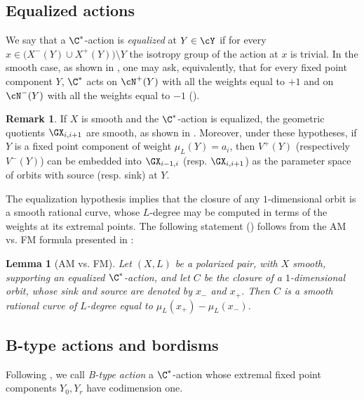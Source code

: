 \documentclass[reqno]{amsproc}
\newtheorem{lemma}[theorem]{Lemma}
\theoremstyle{definition}
\newtheorem{remark}[theorem]{Remark}
\begin{document}

\subsection{Equalized actions}\label{sssec:equal}

We say that a $\C^*$-action  is {\em  equalized} at $Y\in\cY$ if for every $x\in \big(X^{-}(Y)\cup X^{+}(Y)\big)\setminus Y$ the isotropy group of the action at $x$ is trivial. In the smooth case,  as shown in \cite[Lemma 2.1]{WORS3}, one may ask, equivalently, that for
every  fixed point component 
$Y$, $\C^*$ acts on $\cN^+(Y)$ with all the weights equal to $+1$ and on $\cN^-(Y)$ with all the weights equal to $-1$ (\cite[Definition 1]{RW}). 

\begin{remark}\label{rem:normalquot}
If $X$ is smooth and the $\C^*$-action is equalized, the geometric quotients $\GX_{i,i+1}$ are smooth, as shown in  \cite[Lemma 2.15]{WORS3}. Moreover, under these hypotheses, if $Y$ is a fixed point component of weight $\mu_L(Y)=a_i$, then  $V^+(Y)$ (respectively $V^-(Y)$) can be embedded into $\GX_{i-1,i}$  (resp. $\GX_{i,i+1}$) as the parameter space of orbits with source (resp. sink) at $Y$.
\end{remark}

The equalization hypothesis implies that the closure of any $1$-dim\-ens\-ional orbit is a smooth rational curve, whose $L$-degree may be computed in terms of the weights at its extremal points. 
The following statement (\cite[Lemma 2.2]{WORS3}) follows from the AM vs. FM formula presented in \cite[Corollary 3.2]{RW}: 

\begin{lemma}[AM vs. FM]\label{lem:AMFM}
Let $(X,L)$ be a polarized pair, with $X$ smooth, supporting an equalized $\C^*$-action, and let $C$ be the closure of a $1$-dimensional orbit, whose sink and source are denoted by $x_-$ and $x_+$. Then $C$ is a smooth rational curve of $L$-degree  equal to $\mu_L(x_+)-\mu_L(x_-)$.
\end{lemma} 

\subsection{B-type actions and bordisms}\label{sssec:btype} 
Following \cite[Section 3]{WORS1}, we call  {\em B-type action} a $\C^*$-action whose extremal fixed point components $Y_0,Y_r$ have codimension one. 
\end{document}
